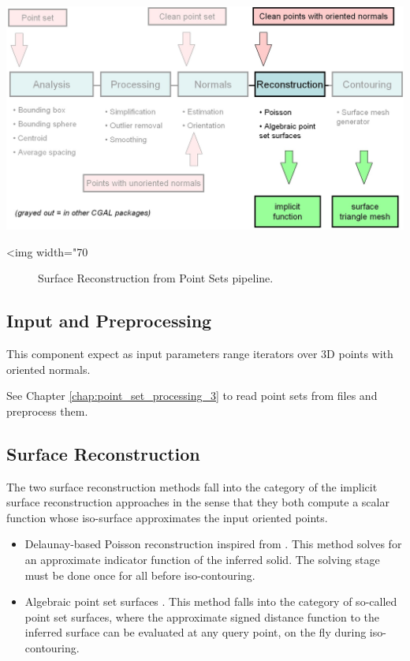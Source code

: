\begin{center}
    \label{Surface_reconstruction_points_3-fig-pipeline}
    \begin{ccTexOnly}
        \includegraphics[width=1.0\textwidth]{Surface_reconstruction_points_3/pipeline} %
    \end{ccTexOnly}
    \begin{ccHtmlOnly}
        <img width="70%
    \end{ccHtmlOnly}
    \begin{figure}[h]
        \caption{Surface Reconstruction from Point Sets pipeline.}
    \end{figure}
\end{center}


\subsection{Input and Preprocessing}

This component expect as input parameters range iterators over 3D points with oriented normals.

See Chapter  \ref{chap:point_set_processing_3} to read point sets from files and preprocess them.


\subsection{Surface Reconstruction}

The two surface reconstruction methods fall into the category of the implicit surface reconstruction approaches in the sense that they both compute a scalar function whose iso-surface approximates the input oriented points.
\begin{itemize}
\item Delaunay-based Poisson reconstruction inspired
      from \cite{Kazhdan06}. This method solves for
      an approximate indicator function of the inferred
      solid. The solving stage must be done once for all
      before iso-contouring. %
\item Algebraic point set surfaces \cite{Guennebaud07}.
      This method falls into the category of so-called
      point set surfaces, where the approximate
      signed distance function to the inferred surface
      can be evaluated at any query point, on the fly
      during iso-contouring.
\end{itemize}

